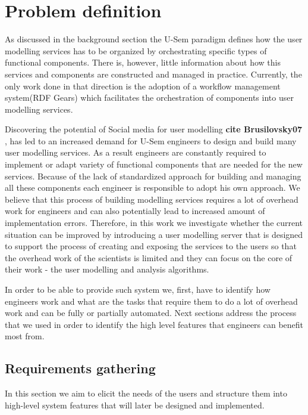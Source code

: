 
\chapter{Problem definition}

As discussed in the background section the U-Sem paradigm defines how the user modelling services has to be organized by orchestrating specific types of functional components. There is, however, little information about how this services and components are constructed and managed in practice. Currently, the only work done in that direction is the adoption of a workflow management system(RDF Gears) which facilitates the orchestration of components into user modelling services. 

Discovering the potential of Social media for user modelling \textbf{cite Brusilovsky07} , has led to an increased demand for U-Sem engineers to design and build many user modelling services. As a result engineers are constantly required to implement or adapt variety of functional components that are needed for the new services. Because of the lack of standardized approach for building and managing all these components each engineer is responsible to adopt his own approach. We believe that this process of building modelling services requires a lot of overhead work for engineers and can also potentially lead to increased amount of implementation errors. Therefore, in this work we investigate whether the current situation can be improved by introducing a user modelling server that is designed to support the process of creating and exposing the services to the users so that the overhead work of the scientists is limited and they can focus on the core of their work - the user modelling and analysis algorithms.

In order to be able to provide such system we, first, have to identify how engineers work and what are the tasks that require them to do a lot of overhead work and can be fully or partially automated. Next sections address the process that we used in order to identify the high level features that engineers can benefit most from.

\section{Requirements gathering}

In this section we aim to elicit the needs of the users and structure them into high-level system features that will later be designed and implemented.

